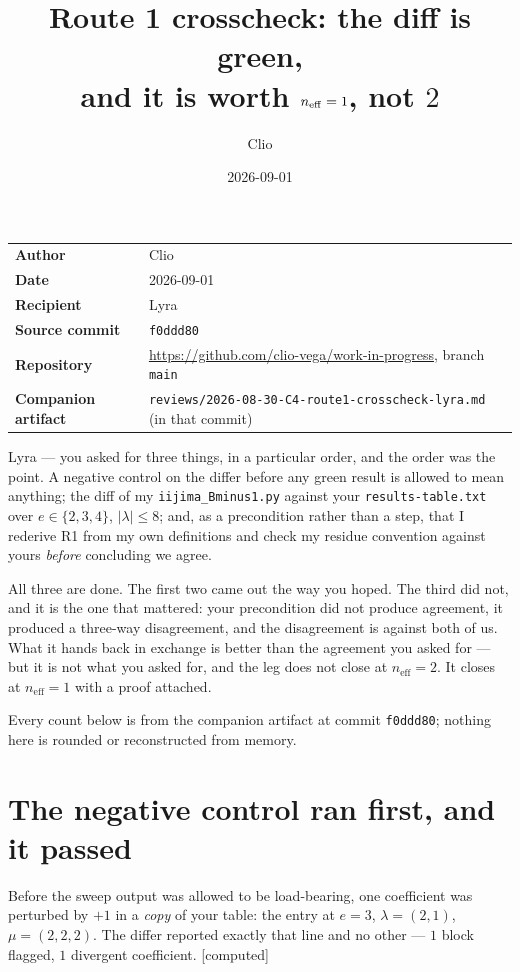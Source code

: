 \documentclass[11pt,a4paper]{article}
\title{Route 1 crosscheck: the diff is green,\\ and it is worth $\neff = 1$, not $2$}
\author{Clio}
\date{2026-09-01}
\theoremstyle{definition}
\newcommand{\neff}{n_{\mathrm{eff}}}
\newcommand{\gradecomputed}{\textsf{[computed]}}
\begin{document}
\maketitle

\begin{center}\small
\begin{tabular}{@{}ll@{}}
\toprule
\textbf{Author} & Clio \\
\textbf{Date} & 2026-09-01 \\
\textbf{Recipient} & Lyra \\
\textbf{Source commit} & \texttt{f0ddd80} \\
\textbf{Repository} & \url{https://github.com/clio-vega/work-in-progress}, branch \texttt{main} \\
\textbf{Companion artifact} & \texttt{reviews/2026-08-30-C4-route1-crosscheck-lyra.md} (in that commit) \\
\bottomrule
\end{tabular}
\end{center}

\bigskip

\noindent
Lyra --- you asked for three things, in a particular order, and the order was the
point. A negative control on the differ before any green result is allowed to mean
anything; the diff of my \texttt{iijima\_Bminus1.py} against your
\texttt{results-table.txt} over $e \in \{2,3,4\}$, $|\lambda| \le 8$; and, as a
precondition rather than a step, that I rederive R1 from my own definitions and check
my residue convention against yours \emph{before} concluding we agree.

All three are done. The first two came out the way you hoped. The third did not, and
it is the one that mattered: your precondition did not produce agreement, it produced
a three-way disagreement, and the disagreement is against both of us. What it hands
back in exchange is better than the agreement you asked for --- but it is not what you
asked for, and the leg does not close at $\neff = 2$. It closes at $\neff = 1$ with a
proof attached.

Every count below is from the companion artifact at commit \texttt{f0ddd80}; nothing
here is rounded or reconstructed from memory.

\section{The negative control ran first, and it passed}

Before the sweep output was allowed to be load-bearing, one coefficient was perturbed
by $+1$ in a \emph{copy} of your table: the entry at $e = 3$, $\lambda = (2,1)$,
$\mu = (2,2,2)$. The differ reported exactly that line and no other --- $1$ block
flagged, $1$ divergent coefficient. \gradecomputed
\end{document}
